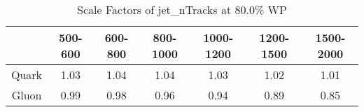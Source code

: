 \begin{table}
\centering
\caption{Scale Factors of jet_nTracks at 80.0\% WP}
\label{tab:jet_nTracks_0.8_Gluon}
\begin{tabular}{ccccccc}
\toprule
{} &  500-600 &  600-800 &  800-1000 &  1000-1200 &  1200-1500 &  1500-2000 \\
\midrule
Quark &     1.03 &     1.04 &      1.04 &       1.03 &       1.02 &       1.01 \\
Gluon &     0.99 &     0.98 &      0.96 &       0.94 &       0.89 &       0.85 \\
\bottomrule
\end{tabular}
\end{table}
